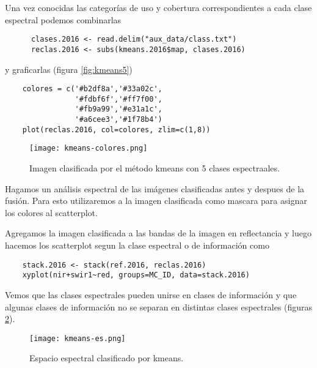 \begin{exa}
  Una vez conocidas las categor\'ias de uso y cobertura correspondientes a cada
  clase espectral podemos combinarlas

  \begin{lstlisting}
      clases.2016 <- read.delim("aux_data/class.txt")
      reclas.2016 <- subs(kmeans.2016$map, clases.2016)
  \end{lstlisting}

  y graficarlas (figura \ref{fig:kmeans5})

  \begin{lstlisting}
    colores = c('#b2df8a','#33a02c',
                '#fdbf6f','#ff7f00',
                '#fb9a99','#e31a1c',
                '#a6cee3','#1f78b4')
    plot(reclas.2016, col=colores, zlim=c(1,8))
  \end{lstlisting}
  \begin{figure}[h!]
    \centering
    \texttt{[image: kmeans-colores.png]}
    \caption{Imagen clasificada por el m\'etodo kmeans con 5 clases espectraales.}
    \label{fig:kmean5}
  \end{figure}
\end{exa}

\begin{exa}
  Hagamos un an\'alisis espectral de las im\'agenes clasificadas antes y despues de la fusi\'on.  Para esto utilizaremos a la imagen clasificada como mascara para asignar los colores  al scatterplot.

  Agregamos la imagen clasificada a las bandas de la imagen en reflectancia y luego hacemos los scatterplot segun la clase espectral o de informaci\'on como

  \begin{lstlisting}
    stack.2016 <- stack(ref.2016, reclas.2016)
    xyplot(nir+swir1~red, groups=MC_ID, data=stack.2016)
  \end{lstlisting}

  Vemos que las clases espectrales pueden unirse en clases de informaci\'on y que algunas clases de informaci\'on no se separan en distintas clases espectrales (figuras \ref{fig:esk}).

  \begin{figure}[h!]
    \centering
    \texttt{[image: kmeans-es.png]}
    \caption{Espacio espectral clasificado por kmeans.}
    \label{fig:esk}
  \end{figure}

\end{exa}

